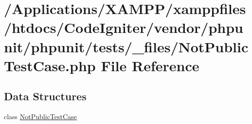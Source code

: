 \hypertarget{_not_public_test_case_8php}{}\section{/\+Applications/\+X\+A\+M\+P\+P/xamppfiles/htdocs/\+Code\+Igniter/vendor/phpunit/phpunit/tests/\+\_\+files/\+Not\+Public\+Test\+Case.php File Reference}
\label{_not_public_test_case_8php}
\subsection*{Data Structures}
\begin{DoxyCompactItemize}
\item 
class \mbox{\hyperlink{class_not_public_test_case}{Not\+Public\+Test\+Case}}
\end{DoxyCompactItemize}
